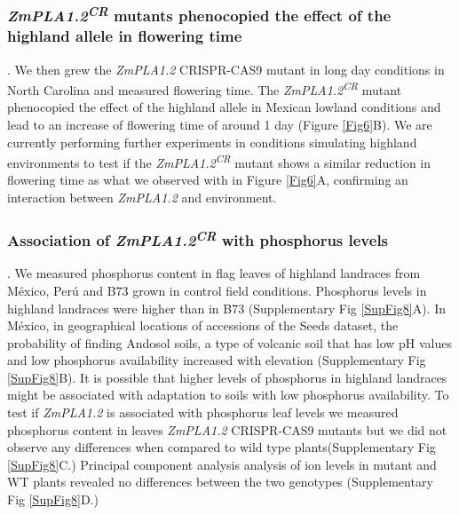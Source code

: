 \documentclass[9pt,twocolumn,twoside,lineno]{BioRxiv}
\begin{document}
\subsubsection{\textit{ZmPLA1.2\textsuperscript{CR}} mutants phenocopied the effect of the highland allele in flowering time}.
We then grew the \textit{ZmPLA1.2} CRISPR-CAS9 mutant in long day conditions in North Carolina and measured flowering time. 
The \textit{ZmPLA1.2\textsuperscript{CR}} mutant phenocopied the effect of the highland allele in Mexican lowland conditions and lead to an increase of flowering time of around 1 day (Figure \ref{Fig6}B). 
We are currently performing further experiments in conditions simulating highland environments to test if the \textit{ZmPLA1.2\textsuperscript{CR}} mutant shows a similar reduction in flowering time as what we observed with in Figure \ref{Fig6}A, confirming an interaction between \textit{ZmPLA1.2} and environment.
\subsubsection{Association of \textit{ZmPLA1.2\textsuperscript{CR}} with phosphorus levels}.
We measured phosphorus content in flag leaves of highland landraces from México, Perú and B73 grown in control field conditions. 
Phosphorus levels in highland landraces were higher than in B73 (Supplementary Fig \ref{SupFig8}A). 
In México, in geographical locations of accessions of the Seeds dataset, the probability of finding Andosol soils, a type of volcanic soil that has low pH values and low phosphorus availability increased with elevation (Supplementary Fig \ref{SupFig8}B).
It is possible that higher levels of phosphorus in highland landraces might be associated with adaptation to soils with low phosphorus availability. 
To test if \textit{ZmPLA1.2} is associated with phosphorus leaf levels we measured phosphorus content in leaves \textit{ZmPLA1.2} CRISPR-CAS9 mutants but we did not observe any differences when compared to wild type plants(Supplementary Fig \ref{SupFig8}C.) 
Principal component analysis analysis of ion levels in mutant and WT plants revealed no differences between the two genotypes (Supplementary Fig \ref{SupFig8}D.) 
\end{document}
